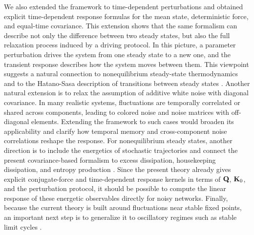 We also extended the framework to time-dependent perturbations and obtained explicit time-dependent response formulas for the mean state, deterministic force, and equal-time covariance. This extension shows that the same formalism can describe not only the difference between two steady states, but also the full relaxation process induced by a driving protocol. In this picture, a parameter perturbation drives the system from one steady state to a new one, and the transient response describes how the system moves between them. This viewpoint suggests a natural connection to nonequilibrium steady-state thermodynamics and to the Hatano-Sasa description of transitions between steady states \cite{10.1143/PTPS.130.29,PhysRevLett.86.3463,doi:10.1073/pnas.0406405101}. Another natural extension is to relax the assumption of additive white noise with diagonal covariance. In many realistic systems, fluctuations are temporally correlated or shared across components, leading to colored noise \cite{PhysRevLett.84.3017, PhysRevResearch.5.033208, qrvl-mng6} and noise matrices with off-diagonal elements. Extending the framework to such cases would broaden its applicability and clarify how temporal memory and cross-component noise correlations reshape the response. For nonequilibrium steady states, another direction is to include the energetics of stochastic trajectories \cite{10.1143/PTPS.130.17} and connect the present covariance-based formalism to excess dissipation, housekeeping dissipation, and entropy production \cite{Seifert_2010, Seifert_2012, Mehl_2010}. Since the present theory already gives explicit conjugate-force and time-dependent response kernels in terms of ${\bf Q}$, ${\bf K}_0$, and the perturbation protocol, it should be possible to compute the linear response of these energetic observables directly for noisy networks. Finally, because the current theory is built around fluctuations near stable fixed points, an important next step is to generalize it to oscillatory regimes such as stable limit cycles \cite{PhysRevE.108.064114}.
